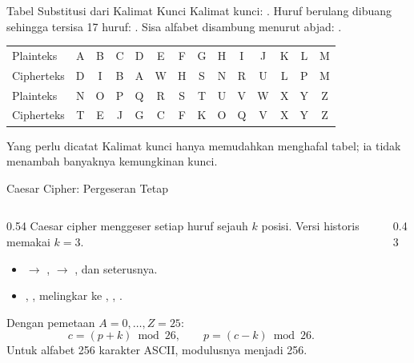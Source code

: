 \documentclass[aspectratio=169,11pt]{beamer}
\begin{document}
\begin{frame}{Tabel Substitusi dari Kalimat Kunci}
    \footnotesize
    Kalimat kunci: .
    Huruf berulang dibuang sehingga tersisa 17 huruf:
    . Sisa alfabet disambung menurut abjad:
    .
    \vspace{0.1cm}
    \begin{center}
    \scriptsize
    \setlength{\tabcolsep}{3pt}
    \begin{tabular}{@{}l*{13}{c}@{}}
        \toprule
        Plainteks  & A&B&C&D&E&F&G&H&I&J&K&L&M \\
        Cipherteks & D&I&B&A&W&H&S&N&R&U&L&P&M \\
        \midrule
        Plainteks  & N&O&P&Q&R&S&T&U&V&W&X&Y&Z \\
        Cipherteks & T&E&J&G&C&F&K&O&Q&V&X&Y&Z \\
        \bottomrule
    \end{tabular}
    \end{center}
    \vspace{0.05cm}
    \begin{block}{Yang perlu dicatat}
        \footnotesize
        Kalimat kunci hanya memudahkan menghafal tabel; ia tidak menambah
        banyaknya kemungkinan kunci.
    \end{block}
\end{frame}

\begin{frame}{Caesar Cipher: Pergeseran Tetap}
    \begin{columns}[T,onlytextwidth]
        \begin{column}{0.54\textwidth}
            Caesar cipher menggeser setiap huruf sejauh $k$ posisi. Versi
            historis memakai $k=3$.
            \begin{itemize}
                \item {} $\rightarrow$ ,
                       $\rightarrow$ , dan seterusnya.
                \item {}, ,  melingkar ke
                      , , .
            \end{itemize}
            Dengan pemetaan $A=0,\dots,Z=25$:
            \[
                c=(p+k)\bmod 26, \qquad p=(c-k)\bmod 26.
            \]
            \footnotesize
            Untuk alfabet 256 karakter ASCII, modulusnya menjadi 256.
        \end{column}
        \begin{column}{0.43\textwidth}
            \centering
        \end{column}
    \end{columns}
\end{frame}
\end{document}
